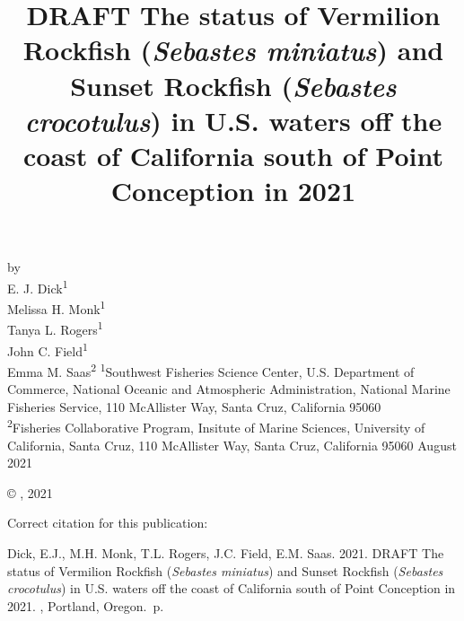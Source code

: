 \documentclass[11pt,
  english,
]{article}
\date{}
\newcommand{\trTitle}{DRAFT The status of Vermilion Rockfish (\emph{Sebastes miniatus}) and Sunset Rockfish (\emph{Sebastes crocotulus}) in U.S. waters off the coast of California south of Point Conception in 2021}
\newcommand{\trYear}{2021}
\newcommand{\trMonth}{August}
\newcommand{\trAuthsBack}{Dick, E.J., M.H. Monk, T.L. Rogers, J.C. Field, E.M. Saas}
\newcommand{\trCitation}{
\begin{hangparas}{1em}{1}
\trAuthsBack{}. \trYear{}. \trTitle{}. \glsentrylong{pfmc}, Portland, Oregon. \pageref{LastPage}{}\,p.
\end{hangparas}}
\begin{document}

\renewcommand*{\thefootnote}{\fnsymbol{footnote}}

\small
\thispagestyle{empty}
\noindent
\begin{center}
\title{DRAFT The status of Vermilion Rockfish (\emph{Sebastes miniatus}) and Sunset Rockfish (\emph{Sebastes crocotulus}) in U.S. waters off the coast of California south of Point Conception in 2021}
\vspace{1.5cm}
{\Large\textbf{}}
\vfill
by\\
E. J. Dick\textsuperscript{1}\\
Melissa H. Monk\textsuperscript{1}\\
Tanya L. Rogers\textsuperscript{1}\\
John C. Field\textsuperscript{1}\\
Emma M. Saas\textsuperscript{2}\vfill
\textsuperscript{1}Southwest Fisheries Science Center, U.S. Department of Commerce, National Oceanic and Atmospheric Administration, National Marine Fisheries Service, 110 McAllister Way, Santa Cruz, California 95060\\
\textsuperscript{2}Fisheries Collaborative Program, Insitute of Marine Sciences, University of California, Santa Cruz, 110 McAllister Way, Santa Cruz, California 95060\vfill
\trMonth{} \trYear{}
\end{center}
\clearpage

\thispagestyle{empty}
\vspace*{\fill}
\begin{center}
\copyright{} , \trYear{}\\
\end{center}
\par
\bigskip
\noindent
Correct citation for this publication:
\bigskip
\par
\trCitation{}
\clearpage


\tableofcontents\clearpage
\label{TRlastRoman}
\clearpage
\end{document}
